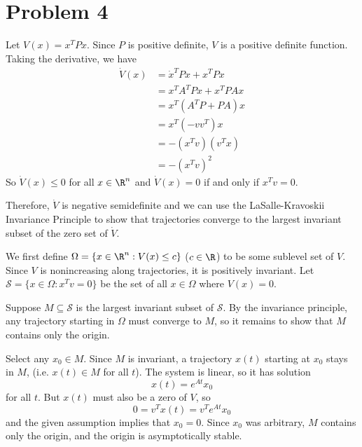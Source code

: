 \documentclass{homework}
\begin{document}
\section{Problem 4}

Let $V(x) = x^T P x$. Since $P$ is positive definite, $V$ is a positive
definite function. Taking the derivative, we have
\begin{align*}
    \dot{V}(x) &= \dot{x}^T P x + x^T P x \\
        &= x^TA^T P x + x^T PA x \\
        &= x^T (A^T P + PA) x \\
        &= x^T (-vv^T) x \\
        &= - (x^T v) (v^T x) \\
        &= - (x^T v)^2
\end{align*}
So $\dot{V}(x) \leq 0$ for all $x\in\R^n$
and $\dot{V}(x) = 0$ if and only if $x^T v = 0$.

Therefore, $\dot{V}$ is negative semidefinite and we can use the LaSalle-Kravoskii
Invariance Principle to show that trajectories converge to the largest invariant
subset of the zero set of $\dot{V}$.

We first define $\Omega = \{x \in \R^n: V(x) \leq c\}$ ($c \in\R$) to be some sublevel set 
of $V$. Since $V$ is nonincreasing along trajectories, it is positively
invariant.  Let $\mathcal{S} = \{x\in\Omega: x^T v = 0\}$ be the set of all $x\in\Omega$ where
$V(x) = 0$. 

Suppose $M \subseteq \mathcal{S}$ is the largest invariant subset of $\mathcal{S}$.
By the invariance principle, any trajectory starting
in $\Omega$ must converge to $M$, so it remains to show that $M$ contains only
the origin.

Select any $x_0 \in M$. Since $M$ is invariant, a trajectory $x(t)$
starting at $x_0$ stays in $M$, (i.e. $x(t) \in M$ for all $t$). 
The system is linear, so it has solution 
\begin{equation*}
    x(t) = e^{At} x_0
\end{equation*}
for all $t$.  But $x(t)$ must also be a zero of $V$, so
\begin{equation*}
    0 = v^T x(t) = v^T e^{At} x_0 
\end{equation*}
and the given assumption implies that $x_0 = 0$.
Since $x_0$ was arbitrary, $M$ contains only the origin, and the origin
is asymptotically stable.
\end{document}
